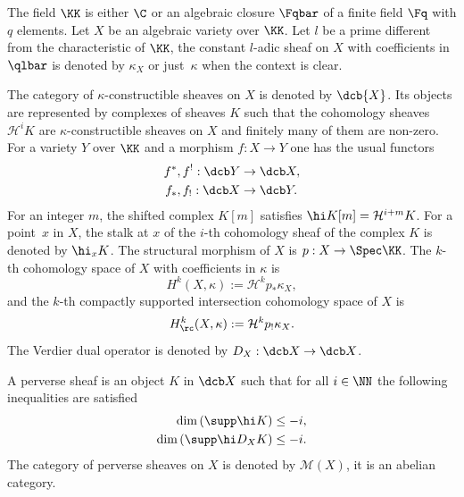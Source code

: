 The field $\KK$ is either $\C$ or an algebraic closure $\Fqbar$ of a finite field $\Fq$ with $q$ elements. Let $X$ be an algebraic variety over $\KK$. Let $l$ be a prime different from the characteristic of $\KK$, the constant $l$-adic sheaf on $X$ with coefficients in $\qlbar$ is denoted by $\kappa_X$ or just~$\kappa$ when the context is clear.

\begin{notations}
The category of $\kappa$-constructible sheaves on $X$ is denoted by $\dcb{X}$. Its objects are represented by complexes of sheaves $K$ such that the cohomology sheaves $\mathcal H ^i K$ are $\kappa$-constructible sheaves on $X$ and finitely many of them are non-zero. For a variety $Y$ over $\KK$ and a morphism $f:X\to Y$ one has the usual functors
\begin{align*}
f^*, f^! : \dcb Y &\to \dcb X,\\
f_*, f_! : \dcb X &\to \dcb Y.
\end{align*}
For an integer $m$, the shifted complex $K[m]$ satisfies $\hi K[m] = \mathcal{H}^{i+m}K$. For a point~$x$ in $X$, the stalk at $x$ of the $i$-th cohomology sheaf of the complex $K$ is denoted by $\hi_x K $. The structural morphism of $X$ is $p:X\to\Spec\KK$. The $k$-th cohomology space of $X$ with coefficients in $\kappa$ is
\[
H^k(X,\kappa) := \mathcal{H}^k p_* \kappa_X,
\]
and the $k$-th compactly supported intersection cohomology space of $X$ is
\[
H^k_\rc (X,\kappa) := \mathcal{H}^k p_! \kappa_X.
\]
The Verdier dual operator is denoted by $D_X:\dcb X \to \dcb X$.
\end{notations}

\begin{definition}
A perverse sheaf is an object $K$ in $\dcb X$ such that for all $i\in\NN$ the following inequalities are satisfied
\begin{align*}
\dim \left(\supp \hi K\right) &\le -i, \\
\dim \left(\supp \hi D_X K\right) &\le -i.
\end{align*}
The category of perverse sheaves on $X$ is denoted by $\mathcal{M}(X)$, it is an abelian category.
\end{definition}

